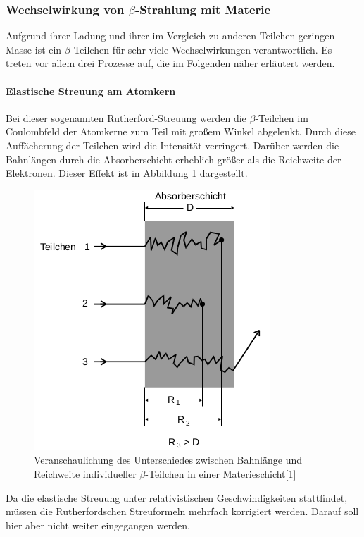 \documentclass[11pt,ngerman,a4paper]{article}
\begin{document}
\subsubsection{Wechselwirkung von $\beta$-Strahlung mit Materie}
Aufgrund ihrer Ladung und ihrer im Vergleich zu anderen Teilchen geringen Masse ist ein $\beta$-Teilchen für sehr viele Wechselwirkungen verantwortlich. Es treten vor allem drei Prozesse auf, die im Folgenden näher erläutert werden.
\paragraph{Elastische Streuung am Atomkern}
Bei dieser sogenannten Rutherford-Streuung werden die $\beta$-Teilchen im Coulombfeld der Atomkerne zum Teil mit großem Winkel abgelenkt. Durch diese Auffächerung der Teilchen wird die Intensität verringert. Darüber werden die Bahnlängen durch die Absorberschicht erheblich größer als die Reichweite der Elektronen. Dieser Effekt ist in Abbildung \ref{a2} dargestellt. 
\begin{figure}[h]
\centering
\includegraphics[scale=0.6]{abb2.png}
\caption{Veranschaulichung des Unterschiedes zwischen Bahnlänge und Reichweite individueller $\beta$-Teilchen in einer Materieschicht[1]}
\label{a2}
\end{figure}
Da die elastische Streuung unter relativistischen Geschwindigkeiten stattfindet, müssen die Rutherfordschen Streuformeln mehrfach korrigiert werden. Darauf soll hier aber nicht weiter eingegangen werden.
\end{document}
